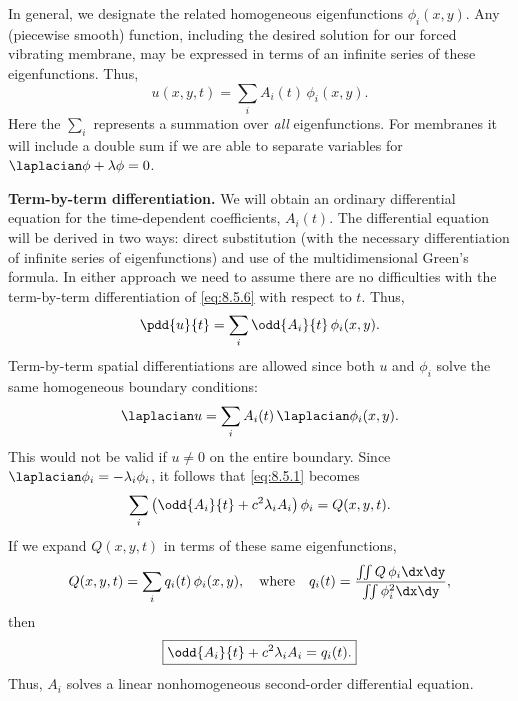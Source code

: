 In general, we designate the related homogeneous eigenfunctions $\phi_i(x,y)$.  Any (piecewise smooth) function, including the desired solution for our forced vibrating membrane, may be expressed in terms of an infinite series of these eigenfunctions.  Thus,
\begin{equation}
\label{eq:8.5.6}
\boxed{u(x,y,t) = \sum_i A_i(t)\,\phi_i(x,y).}
\end{equation}
Here the $\sum_i$ represents a summation over \emph{all} eigenfunctions.  For membranes it will include a double sum if we are able to separate variables for $\laplacian\phi + \lambda\phi = 0$.

\textbf{Term-by-term differentiation.}
We will obtain an ordinary differential equation for the time-dependent coefficients, $A_i(t)$.  The differential equation will be derived in two ways: direct substitution (with the necessary differentiation of infinite series of eigenfunctions) and use of the multidimensional Green's formula.  In either approach we need to assume there are no difficulties with the term-by-term differentiation of \eqref{eq:8.5.6} with respect to $t$.  Thus,
\begin{equation}
\label{eq:8.5.7}
\pdd{u}{t} = \sum_i \odd{A_i}{t}\,\phi_i(x,y).
\end{equation}
Term-by-term spatial differentiations are allowed since both $u$ and $\phi_i$ solve the same homogeneous boundary conditions:
\begin{equation}
\label{eq:8.5.8}
\laplacian u = \sum_i A_i(t)\,\laplacian\phi_i(x,y).
\end{equation}
This would not be valid if $u\neq 0$ on the entire boundary.  Since $\laplacian\phi_i = -\lambda_i\phi_i$, it follows that \eqref{eq:8.5.1} becomes
\begin{equation}
\label{eq:8.5.9}
\sum_i \left(\odd{A_i}{t} + c^2\lambda_i A_i\right)\phi_i = Q(x,y,t).
\end{equation}
If we expand $Q(x,y,t)$ in terms of these same eigenfunctions,
\begin{equation}
\label{eq:8.5.10}
Q(x,y,t) = \sum_i q_i(t)\,\phi_i(x,y),\quad\text{where}\quad
q_i(t) = \frac{\iint Q\,\phi_i\dx\dy}{\iint \phi_i^2\dx\dy},
\end{equation}
then
\begin{equation}
\label{eq:8.5.11}
\boxed{\odd{A_i}{t} + c^2\lambda_i A_i = q_i(t).}
\end{equation}
Thus, $A_i$ solves a linear nonhomogeneous second-order differential equation.


